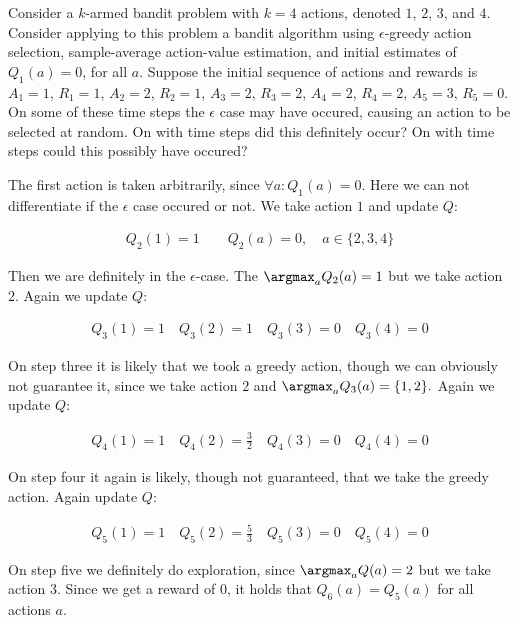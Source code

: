 \begin{exercise}
Consider a $k$-armed bandit problem with $k = 4$ actions, denoted $1$, $2$, $3$, and $4$.
Consider applying to this problem a bandit algorithm using $\epsilon$-greedy action selection, sample-average action-value estimation, and initial estimates of $Q_1(a) = 0$, for all $a$.
Suppose the initial sequence of actions and rewards is $A_1 = 1$, $R_1 = 1$, $A_2 = 2$, $R_2 = 1$, $A_3 = 2$, $R_3 = 2$, $A_4 = 2$, $R_4 = 2$, $A_5 = 3$, $R_5 = 0$.
On some of these time steps the $\epsilon$ case may have occured, causing an action to be selected at random.
On with time steps did this definitely occur?
On with time steps could this possibly have occured?
\end{exercise}

\begin{solution}
The first action is taken arbitrarily, since $\forall a: Q_1(a)=0$. Here we can not differentiate if the $\epsilon$ case occured or not. We take action $1$ and update $Q$:

\begin{align*}
  Q_2(1) = 1
  \qquad
  Q_2(a) = 0, \quad a \in \{2,3,4\}
\end{align*}

Then we are definitely in the $\epsilon$-case. The $\argmax_a Q_2(a) = 1$ but we take action $2$. Again we update $Q$:

\begin{align*}
  Q_3(1) = 1
  \quad
  Q_3(2) = 1
  \quad
  Q_3(3) = 0
  \quad
  Q_3(4) = 0
\end{align*}

On step three it is likely that we took a greedy action, though we can obviously not guarantee it, since we take action $2$ and $\argmax_a Q_3(a) = \{1,2\}.$ Again we update $Q$:

\begin{align*}
  Q_4(1) = 1
  \quad
  Q_4(2) = \frac{3}{2}
  \quad
  Q_4(3) = 0
  \quad
  Q_4(4) = 0
\end{align*}

On step four it again is likely, though not guaranteed, that we take the greedy action. Again update $Q$:

\begin{align*}
  Q_5(1) = 1
  \quad
  Q_5(2) = \frac{5}{3}
  \quad
  Q_5(3) = 0
  \quad
  Q_5(4) = 0
\end{align*}

On step five we definitely do exploration, since $\argmax_a Q(a) = 2$ but we take action 3. Since we get a reward of 0, it holds that $Q_6(a) = Q_5(a)$ for all actions $a$.
\end{solution}
